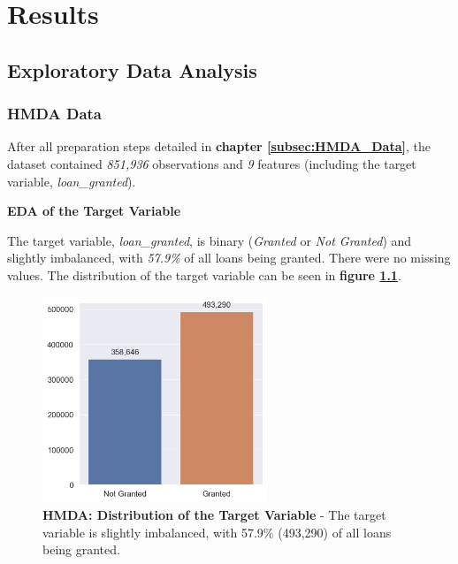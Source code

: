 \chapter{Results}\label{chap:Results}

\section{Exploratory Data Analysis}\label{sec:Exploratory_Data_Analysis}

\subsection{HMDA Data}\label{subsec:HMDA_EDA}

After all preparation steps detailed in \textbf{chapter \ref{subsec:HMDA_Data}}, the dataset contained \textit{851,936} observations and \textit{9} features (including the target variable, \textit{loan\_granted}). 

\textbf{EDA of the Target Variable}

The target variable, \textit{loan\_granted}, is binary (\textit{Granted} or \textit{Not Granted}) and slightly imbalanced, with \textit{57.9\%} of all loans being granted. 
There were no missing values. The distribution of the target variable can be seen in \textbf{figure \ref{fig:CHXX_Target_Variable_Distribution}}.

\begin{figure}[!htbp]
    \centering
    \includegraphics[width=0.6\textwidth]{images/CHXX_Target_Variable_Distribution.png}
    \caption[HMDA: Distribution of the Target Variable]{\textbf{HMDA: Distribution of the Target Variable} - The target variable is slightly imbalanced, with 57.9\% (493,290) of all loans being granted.}
    \label{fig:CHXX_Target_Variable_Distribution}
\end{figure}

